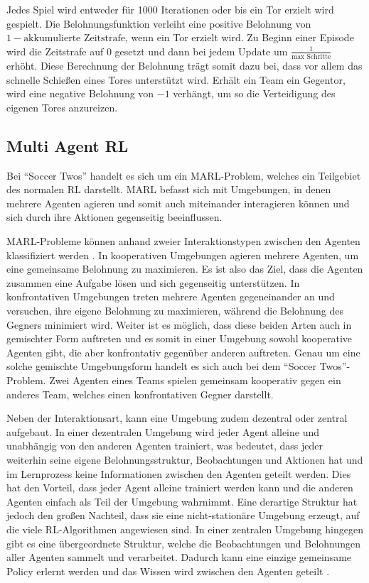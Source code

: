 \documentclass[twocolumn]{webofc}
\begin{document}
Jedes Spiel wird entweder für 1000 Iterationen oder bis ein Tor erzielt wird gespielt. Die Belohnungsfunktion verleiht eine positive Belohnung von \(1 - \text{akkumulierte Zeitstrafe}\), wenn ein Tor erzielt wird. Zu Beginn einer Episode wird die Zeitstrafe auf \(0\) gesetzt und dann bei jedem Update um \( \frac{1}{\text{max Schritte}} \) erhöht. Diese Berechnung der Belohnung trägt somit dazu bei, dass vor allem das schnelle Schießen eines Tores unterstützt wird.  Erhält ein Team ein Gegentor, wird eine negative Belohnung von \(-1\) verhängt, um so die Verteidigung des eigenen Tores anzureizen.

\subsection{Multi Agent \acl{RL}}

Bei \enquote{Soccer Twos} handelt es sich um ein \ac{MARL}-Problem, welches ein Teilgebiet des normalen \ac{RL} darstellt. \ac{MARL} befasst sich mit Umgebungen, in denen mehrere Agenten agieren und somit auch miteinander interagieren können und sich durch ihre Aktionen gegenseitig beeinflussen.

\ac{MARL}-Probleme können anhand zweier Interaktionstypen zwischen den Agenten klassifiziert werden \cite{10.1007/11691839_1}. In kooperativen Umgebungen agieren mehrere Agenten, um eine gemeinsame Belohnung zu maximieren. Es ist also das Ziel, dass die Agenten zusammen eine Aufgabe lösen und sich gegenseitig unterstützen. In konfrontativen Umgebungen treten mehrere Agenten gegeneinander an und versuchen, ihre eigene Belohnung zu maximieren, während die Belohnung des Gegners minimiert wird.
Weiter ist es möglich, dass diese beiden Arten auch in gemischter Form auftreten und es somit in einer Umgebung sowohl kooperative Agenten gibt, die aber konfrontativ gegenüber anderen auftreten. Genau um eine solche gemischte Umgebungsform handelt es sich auch bei dem \enquote{Soccer Twos}-Problem. Zwei Agenten eines Teams spielen gemeinsam kooperativ gegen ein anderes Team, welches einen konfrontativen Gegner darstellt.

Neben der Interaktionsart, kann eine Umgebung zudem dezentral oder zentral aufgebaut. In einer dezentralen Umgebung wird jeder Agent alleine und unabhängig von den anderen Agenten trainiert, was bedeutet, dass jeder weiterhin seine eigene Belohnungsstruktur, Beobachtungen und Aktionen hat und im Lernprozess keine Informationen zwischen den Agenten geteilt werden. Dies hat den Vorteil, dass jeder Agent alleine trainiert werden kann und die anderen Agenten einfach als Teil der Umgebung wahrnimmt. Eine derartige Struktur hat jedoch den großen Nachteil, dass sie eine nicht-stationäre Umgebung erzeugt, auf die viele \ac{RL}-Algorithmen angewiesen sind.
In einer zentralen Umgebung hingegen gibt es eine übergeordnete Struktur, welche die Beobachtungen und Belohnungen aller Agenten sammelt und verarbeitet. Dadurch kann eine einzige gemeinsame Policy erlernt werden und das Wissen wird zwischen den Agenten geteilt \cite{Tan:1993}. %
\end{document}
